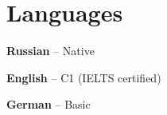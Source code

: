 \documentclass[11pt,a4paper]{moderncv}
\begin{document}
\section{Languages}
{\begin{multicols}{3}
\textbf{Russian} -- Native

\textbf{English} -- C1 (IELTS certified)

\textbf{German} -- Basic

\end{multicols}
}
\end{document}
